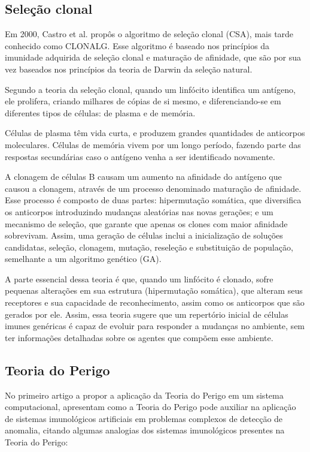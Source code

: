 \subsection{Seleção clonal}

Em 2000, Castro et al.\cite{Castro2000} propôs o algoritmo de seleção clonal (CSA), mais tarde conhecido como CLONALG. Esse algoritmo é baseado nos princípios da imunidade adquirida de seleção clonal e maturação de afinidade, que são por sua vez baseados nos princípios da teoria de Darwin da seleção natural.

Segundo a teoria da seleção clonal, quando um linfócito identifica um antígeno, ele prolifera, criando milhares de cópias de si mesmo, e diferenciando-se em diferentes tipos de células: de plasma e de memória.

Células de plasma têm vida curta, e produzem grandes quantidades de anticorpos moleculares. Células de memória vivem por um longo período, fazendo parte das respostas secundárias caso o antígeno venha a ser identificado novamente.

A clonagem de células B causam um aumento na afinidade do antígeno que causou a clonagem, através de um processo denominado maturação de afinidade. Esse processo é composto de duas partes: hipermutação somática, que diversifica os anticorpos introduzindo mudanças aleatórias nas novas gerações; e um mecanismo de seleção, que garante que apenas os clones com maior afinidade sobrevivam. Assim, uma geração de células inclui a inicialização de soluções candidatas, seleção, clonagem, mutação, reseleção e substituição de população, semelhante a um algoritmo genético (GA).

A parte essencial dessa teoria é que, quando um linfócito é clonado, sofre pequenas alterações em sua estrutura (hipermutação somática), que alteram seus receptores e sua capacidade de reconhecimento, assim como os anticorpos que são gerados por ele. Assim, essa teoria sugere que um repertório inicial de células imunes genéricas é capaz de evoluir para responder a mudanças no ambiente, sem ter informações detalhadas sobre os agentes que compõem esse ambiente.

\subsection{Teoria do Perigo}

No primeiro artigo a propor a aplicação da Teoria do Perigo em um sistema computacional, \citeauthor{Aickelin2002} apresentam como a Teoria do Perigo pode auxiliar na aplicação de sistemas imunológicos artificiais em problemas complexos de detecção de anomalia, citando algumas analogias dos sistemas imunológicos presentes na Teoria do Perigo:

